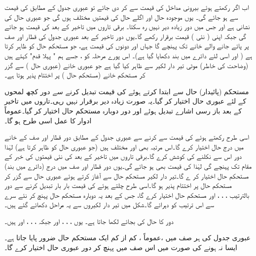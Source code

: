 اب اگر  رکھتے ہوئے بیرونی مداخل  کی قیمت  سے  کر دی جائے تو عبوری جدول کے مطابق  کی قیمت  سے  ہو جائے گی۔ یوں موجودہ حال  اور اگلے حال  کی قیمتیں مختلف ہوں گی جو عبوری حال کی نشانی ہے اور جس میں دور زیادہ دیر نہیں رہ سکتا۔ برقی تاروں میں تاخیر کے بعد  کی قیمت  ہو جائے گی جبکہ  اپنی ( نئی ) قیمت  برقرار رکھے گا۔یوں دور تاخیر کے بعد عبوری جدول کی  قطار اور  صف پر پائے جانے والے خانے تک پہنچے گا جہاں  اور  دونوں کی قیمت  ہے، جو مستحکم حال کو ظاہر کرتا ہے ( اور اسی لئے دائرے میں بند دکھایا گیا ہے)۔ اس پورے مرحلہ کو   ، جسے ہم " پہلا قدم"  کہتے ہیں (وضاحت کی خاطر)  موٹی   تیر دار لکیر سے ظاہر کیا گیا ہے جو عبوری خانے  (عبوری حال ) سے گزر کر مستحکم خانے (مستحکم حال   )  پر اختتام پذیر ہوتا ہے۔

 مستحکم (پائیدار) حال سے ابتدا کرتے ہوئے  کی قیمت تبدیل کرنے سے دور کچھ لمحوں کے لئے عبوری حال اختیار کر گیا۔یہ صورت زیادہ دیر برقرار نہیں رہی۔تاروں میں تاخیر کے بعد باز رسی اشارے تبدیل ہوئے اور دور دوبارہ مستحکم حال اختیار کر گیا۔عموماً ادوار کا عمل اسی طرح ہو گا۔

اسی طرح  رکھتے ہوئے  کی قیمت  سے  کرنے سے عبوری جدول کے مطابق دور  قطار اور  صف کے خانے میں درج حال  اختیار کرے گا۔اس مرتبہ بھی  اور  مختلف ہیں (جو عبوری حال کو ظاہر کرتا ہے) لہٰذا دور اس سے نکلنے کی کوشش کرے گا۔برقی تاروں میں تاخیر کے بعد  کی نئی قیمتوں کی خبر  کے مقام تک پہنچے گی لہٰذا  کی قیمت بھی  ہو جائے گی۔یوں دور  قطار اور  صف میں درج (دائرے میں بند) مستحکم حال  اختیار کر ے گا۔تیر دار لکیر مستحکم حال   سے  آغاز کرتے ہوئے عبوری حال  سے گزر کر مستحکم حال   پر اختتام پذیر ہو گا۔اسی طرح چلتے ہوئے  کی قیمت بار بار تبدیل کرنے سے دور بالترتیب  ، ، ، اور  مستحکم حال اختیار کرے گا، جس کے بعد یہ  دوبارہ مستحکم حال  پہنچ کر نئے سرے سے اس ترتیب کو دہرائے گا۔شکل میں تیر دار لکیروں سے یہ مراحل دکھائے گئے ہیں۔

 دور کا حال  کی بجائے  لکھا جاتا ہے۔ یوں ، ، ، اور  جبکہ ، ، ، اور  ہیں۔
 
عبوری جدول کی ہر صف میں ،عموماً ، کم از کم ایک مستحکم حال ضرور پایا جاتا ہے۔ایسا نہ ہونے کی صورت میں اس صف میں پہنچ کر دور عبوری حال اختیار کرے گا۔

